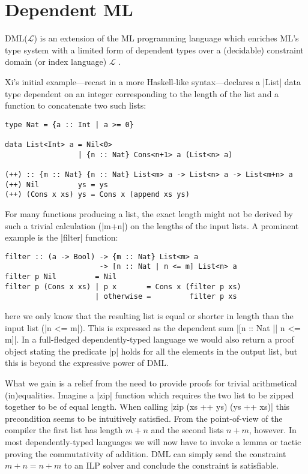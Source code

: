 \section{Dependent ML}
DML($\mathcal{L}$) is an extension of the ML programming language which enriches ML's type system with a limited form of dependent types over a (decidable) constraint domain (or index language) $\mathcal{L}$ \cite{DML-JFP07}.

Xi's initial example---recast in a more Haskell-like syntax---declares a |List| data type dependent on an integer corresponding to the length of the list and a function to concatenate two such lists:
\begin{verbatim}
type Nat = {a :: Int | a >= 0}

data List<Int> a = Nil<0>
                 | {n :: Nat} Cons<n+1> a (List<n> a)

(++) :: {m :: Nat} {n :: Nat} List<m> a -> List<n> a -> List<m+n> a
(++) Nil         ys = ys
(++) (Cons x xs) ys = Cons x (append xs ys)
\end{verbatim}


For many functions producing a list, the exact length might not be derived by such a trivial calculation (|m+n|) on the lengths of the input lists. A prominent example is the |filter| function:
\begin{verbatim}
filter :: (a -> Bool) -> {m :: Nat} List<m> a
                      -> [n :: Nat | n <= m] List<n> a
filter p Nil         = Nil
filter p (Cons x xs) | p x       = Cons x (filter p xs)
                     | otherwise =         filter p xs
\end{verbatim}
here we only know that the resulting list is equal or shorter in length than the input list (|n <= m|). This is expressed as the dependent sum |[n :: Nat || n <= m]|. In a full-fledged dependently-typed language we would also return a proof object stating the predicate |p| holds for all the elements in the output list, but this is beyond the expressive power of DML.

What we gain is a relief from the need to provide proofs for trivial arithmetical (in)equalities. Imagine a |zip| function which requires the two list to be zipped together to be of equal length. When calling |zip (xs ++ ys) (ys ++ xs)| this precondition seems to be intuitively satisfied. From the point-of-view of the compiler the first list has length $m+n$ and the second lists $n+m$, however. In most dependently-typed languages we will now have to invoke a lemma or tactic proving the commutativity of addition. DML can simply send the constraint $m + n = n + m$ to an ILP solver and conclude the constraint is satisfiable.

